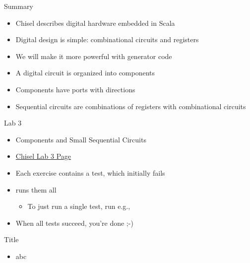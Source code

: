 \begin{frame}[fragile]{Summary}
\begin{itemize}
\item Chisel describes digital hardware embedded in Scala
\item Digital design is simple: combinational circuits and registers
\item We will make it more powerful with generator code
\item A digital circuit is organized into components
\item Components have ports with directions
\item Sequential circuits are combinations of registers with combinational circuits
\end{itemize}
\end{frame}

\begin{frame}[fragile]{Lab 3}
\begin{itemize}
\item Components and Small Sequential Circuits
\item \href{https://github.com/schoeberl/chisel-lab/tree/master/lab3}{Chisel Lab 3 Page}
\item Each exercise contains a test, which initially fails
\item {} runs them all
\begin{itemize}
\item To just run a single test, run e.g.,\\
\end{itemize}
\item When all tests succeed, you're done ;-)
\end{itemize}
\end{frame}




\begin{frame}[fragile]{Title}
\begin{itemize}
\item abc
\end{itemize}
\end{frame}
